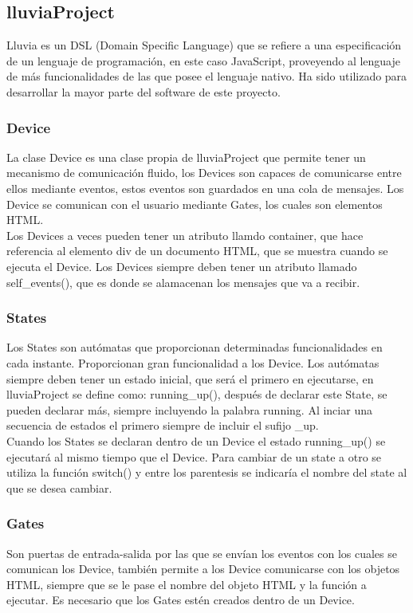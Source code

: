 \documentclass[a4paper,10pt]{article}
\begin{document}
\subsection{lluviaProject}
Lluvia es un DSL (Domain Specific Language) que se refiere a una especificación de un
lenguaje de programación, en este caso JavaScript, proveyendo al lenguaje de más
funcionalidades de las que posee el lenguaje nativo. Ha sido utilizado para desarrollar la
mayor parte del software de este proyecto.
\cleardoublepage

\subsubsection{Device}
La clase Device es una clase propia de lluviaProject que permite tener un mecanismo de comunicación fluido, 
los Devices son capaces de comunicarse entre ellos mediante eventos, estos eventos son guardados 
en una cola de mensajes. 
Los Device se comunican con el usuario mediante Gates, los cuales son elementos HTML. \\

Los Devices a veces pueden tener un atributo llamdo container, que hace referencia al elemento div de un documento HTML, que se 
muestra cuando se ejecuta el Device.
Los Devices siempre deben tener un atributo llamado self\_events(), que es donde se alamacenan los mensajes que va a recibir.


\subsubsection{States}
Los States son autómatas que proporcionan determinadas funcionalidades en cada instante. Proporcionan gran funcionalidad a 
los Device. Los autómatas siempre deben tener un estado inicial, que será el primero en ejecutarse,
en lluviaProject se define como: running\_up(), después de declarar este State, se pueden declarar más, siempre incluyendo la palabra running.
Al inciar una secuencia de estados el primero siempre de incluir el sufijo \_up.\\

Cuando los States se declaran dentro de un Device el estado running\_up() se ejecutará al mismo tiempo que el Device.
Para cambiar de un state a otro se utiliza la función switch() y entre los parentesis se indicaría el nombre del state al que se desea cambiar.\\

\subsubsection{Gates}
Son puertas de entrada-salida por las que se envían los eventos con los cuales se comunican los
Device, también permite a los Device comunicarse con los objetos HTML, siempre que se le pase el nombre 
del objeto HTML y la función a ejecutar. 
Es necesario que los Gates estén creados dentro de un Device.\\
\end{document}
